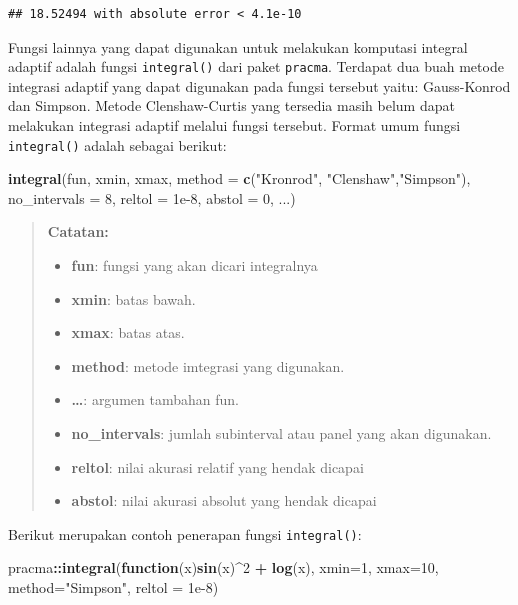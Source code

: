 \documentclass[]{book}
\newenvironment{Shaded}{\begin{snugshade}}{\end{snugshade}}
\newcommand{\ControlFlowTok}[1]{\textcolor[rgb]{0.13,0.29,0.53}{\textbf{#1}}}
\newcommand{\DataTypeTok}[1]{\textcolor[rgb]{0.13,0.29,0.53}{#1}}
\newcommand{\DecValTok}[1]{\textcolor[rgb]{0.00,0.00,0.81}{#1}}
\newcommand{\FloatTok}[1]{\textcolor[rgb]{0.00,0.00,0.81}{#1}}
\newcommand{\KeywordTok}[1]{\textcolor[rgb]{0.13,0.29,0.53}{\textbf{#1}}}
\newcommand{\NormalTok}[1]{#1}
\newcommand{\OperatorTok}[1]{\textcolor[rgb]{0.81,0.36,0.00}{\textbf{#1}}}
\newcommand{\StringTok}[1]{\textcolor[rgb]{0.31,0.60,0.02}{#1}}
\providecommand{\tightlist}{%
  \setlength{\itemsep}{0pt}\setlength{\parskip}{0pt}}
\theoremstyle{definition}
\theoremstyle{definition}
\theoremstyle{definition}
\theoremstyle{remark}
\begin{document}
\begin{verbatim}
## 18.52494 with absolute error < 4.1e-10
\end{verbatim}

Fungsi lainnya yang dapat digunakan untuk melakukan komputasi integral adaptif adalah fungsi \texttt{integral()} dari paket \texttt{pracma}. Terdapat dua buah metode integrasi adaptif yang dapat digunakan pada fungsi tersebut yaitu: Gauss-Konrod dan Simpson. Metode Clenshaw-Curtis yang tersedia masih belum dapat melakukan integrasi adaptif melalui fungsi tersebut. Format umum fungsi \texttt{integral()} adalah sebagai berikut:

\begin{Shaded}
\begin{Highlighting}[]
\KeywordTok{integral}\NormalTok{(fun, xmin, xmax,}
         \DataTypeTok{method =} \KeywordTok{c}\NormalTok{(}\StringTok{"Kronrod"}\NormalTok{, }\StringTok{"Clenshaw"}\NormalTok{,}\StringTok{"Simpson"}\NormalTok{),}
         \DataTypeTok{no_intervals =} \DecValTok{8}\NormalTok{, }\DataTypeTok{reltol =} \FloatTok{1e-8}\NormalTok{, }
         \DataTypeTok{abstol =} \DecValTok{0}\NormalTok{, ...)}
\end{Highlighting}
\end{Shaded}

\begin{quote}
\textbf{Catatan:}

\begin{itemize}
\tightlist
\item
  \textbf{fun}: fungsi yang akan dicari integralnya
\item
  \textbf{xmin}: batas bawah.
\item
  \textbf{xmax}: batas atas.
\item
  \textbf{method}: metode imtegrasi yang digunakan.
\item
  \textbf{\ldots{}}: argumen tambahan fun.
\item
  \textbf{no\_intervals}: jumlah subinterval atau panel yang akan digunakan.
\item
  \textbf{reltol}: nilai akurasi relatif yang hendak dicapai
\item
  \textbf{abstol}: nilai akurasi absolut yang hendak dicapai
\end{itemize}
\end{quote}

Berikut merupakan contoh penerapan fungsi \texttt{integral()}:

\begin{Shaded}
\begin{Highlighting}[]
\NormalTok{pracma}\OperatorTok{::}\KeywordTok{integral}\NormalTok{(}\ControlFlowTok{function}\NormalTok{(x)}\KeywordTok{sin}\NormalTok{(x)}\OperatorTok{^}\DecValTok{2} \OperatorTok{+}\StringTok{ }\KeywordTok{log}\NormalTok{(x),}
          \DataTypeTok{xmin=}\DecValTok{1}\NormalTok{, }\DataTypeTok{xmax=}\DecValTok{10}\NormalTok{, }\DataTypeTok{method=}\StringTok{"Simpson"}\NormalTok{,}
          \DataTypeTok{reltol =} \FloatTok{1e-8}\NormalTok{)}
\end{Highlighting}
\end{Shaded}
\end{document}
